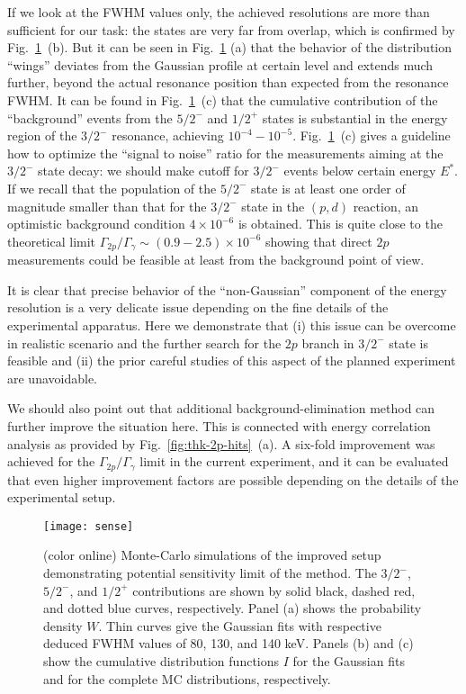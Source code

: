 \documentclass[superscriptaddress,showpacs,showkeys,twoside,floatfix,twocolumn]
{revtex4-1}
\begin{document}
If we look at the FWHM values only, the achieved resolutions are more than
sufficient for our task: the states are very far from overlap, which is confirmed by Fig.~\ref{fig:limit}~(b).
But it can be seen in Fig.~\ref{fig:limit}
(a) that the behavior of the distribution ``wings'' deviates from
the Gaussian profile at certain level and extends much further,
beyond the actual resonance position than expected from the resonance FWHM\@.
It can be found in Fig.~\ref{fig:limit}~(c) that the cumulative contribution of
the ``background'' events from the $5/2^-$ and $1/2^+$ states is substantial in
the energy region of the $3/2^-$ resonance, achieving $10^{-4}-10^{-5}$.
Fig.~\ref{fig:limit}~(c) gives a guideline how to optimize the ``signal to noise''
ratio for the measurements aiming at the $3/2^-$ state decay:
we should make cutoff for $3/2^-$ events below certain energy $E^*$.
If we recall that the population of the $5/2^-$ state is at least one order
of magnitude smaller than that for the $3/2^-$ state in the $(p,d)$ reaction,
an optimistic background condition  $4 \times 10^{-6}$ is obtained.
This is quite close to the theoretical limit
$\Gamma_{2p}/\Gamma_{\gamma}\sim (0.9-2.5) \times 10^{-6}$
showing that direct $2p$ measurements could be feasible at least
from the background point of view.

It is clear that precise behavior of the ``non-Gaussian'' component of
the energy resolution is a very delicate issue depending on the fine details of
the experimental apparatus.
Here we demonstrate that
(i) this issue can be overcome in realistic scenario and the further search for
the $2p$ branch in  $3/2^-$ state is feasible and
(ii) the prior careful studies of this aspect of the planned experiment are unavoidable.


We should also point out that additional background-elimination method can
further improve the situation here.
This is connected with energy correlation analysis as provided by Fig.~\ref{fig:thk-2p-hits}~(a).
A six-fold improvement was achieved for the $\Gamma_{2p}/\Gamma_{\gamma}$ limit
in the current experiment,
and it can be evaluated that even higher improvement factors are possible
depending on the details of the experimental setup.


\begin{figure}[t]
\begin{center}
\texttt{[image: sense]}
\end{center}
\caption{(color online)
  Monte-Carlo simulations of the improved setup demonstrating potential
  sensitivity limit of the method.
  The $3/2^-$, $5/2^-$, and $1/2^+$ contributions are shown by solid black,
  dashed red, and dotted blue curves, respectively.
  Panel (a) shows the probability density $W$.
  Thin curves give the Gaussian fits with respective deduced FWHM values of 80,
  130, and 140 keV.
  Panels (b) and (c) show the cumulative distribution functions $I$
  for the Gaussian fits and for the complete MC distributions, respectively.}
\label{fig:limit}
\end{figure}
\end{document}
